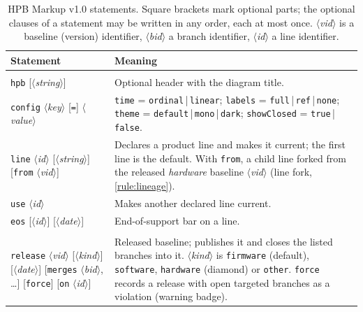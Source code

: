 \providecommand{\HPBkw}[1]{\texttt{#1}}
\providecommand{\HPBph}[1]{\ensuremath{\langle}\textit{#1}\ensuremath{\rangle}}

\begin{table}[p]
  \centering
  \footnotesize
  \caption{HPB Markup v1.0 statements. Square brackets mark optional parts;
    the optional clauses of a statement may be written in any order, each
    at most once. \HPBph{vid} is a baseline (version) identifier,
    \HPBph{bid} a branch identifier, \HPBph{id} a line identifier.}
  \label{tab:markup}
  \renewcommand{\arraystretch}{1.12}
  \begin{tabularx}{\linewidth}{@{}>{\raggedright\arraybackslash}p{5.6cm}
      >{\raggedright\arraybackslash}X@{}}
    \toprule
    \textbf{Statement} & \textbf{Meaning} \\
    \midrule
    \multicolumn{2}{@{}l}{\textit{Document and lines}} \\
    \HPBkw{hpb} [\HPBph{string}]
      & Optional header with the diagram title. \\
    \HPBkw{config} \HPBph{key} [\HPBkw{=}] \HPBph{value}
      & \HPBkw{time} = \HPBkw{ordinal}\,|\,\HPBkw{linear};
        \HPBkw{labels} = \HPBkw{full}\,|\,\HPBkw{ref}\,|\,\HPBkw{none};
        \HPBkw{theme} = \HPBkw{default}\,|\,\HPBkw{mono}\,|\,\HPBkw{dark};
        \HPBkw{showClosed} = \HPBkw{true}\,|\,\HPBkw{false}. \\
    \HPBkw{line} \HPBph{id} [\HPBph{string}] [\HPBkw{from} \HPBph{vid}]
      & Declares a product line and makes it current; the first line is the
        default. With \HPBkw{from}, a child line forked from the released
        \emph{hardware} baseline \HPBph{vid} (line fork, \cref{rule:lineage}). \\
    \HPBkw{use} \HPBph{id}
      & Makes another declared line current. \\
    \HPBkw{eos} [\HPBph{id}] [\HPBph{date}]
      & End-of-support bar on a line. \\
    \midrule
    \multicolumn{2}{@{}l}{\textit{Baselines}} \\
    \HPBkw{release} \HPBph{vid} [\HPBph{kind}] [\HPBph{date}]
      [\HPBkw{merges} \HPBph{bid}, \dots] [\HPBkw{force}] [\HPBkw{on} \HPBph{id}]
      & Released baseline; publishes it and closes the listed branches
        into it. \HPBph{kind} is \HPBkw{firmware} (default),
        \HPBkw{software}, \HPBkw{hardware} (diamond) or \HPBkw{other}.
        \HPBkw{force} records a release with open targeted branches as a
        violation (warning badge). \\

\end{tabularx}
\end{table}
